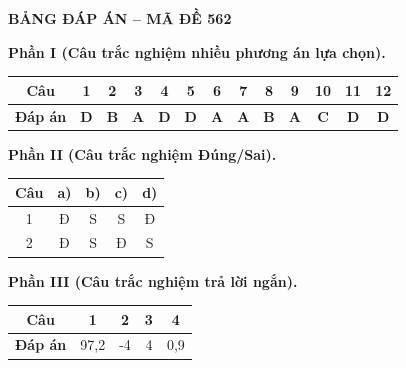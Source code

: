 \vspace{0.4cm}
\noindent\begin{minipage}{\linewidth}
\begin{center}{\large\bfseries\color{red!80!black} BẢNG ĐÁP ÁN -- MÃ ĐỀ 562}\end{center}
\vspace{0.15cm}
\noindent\textbf{Phần I (Câu trắc nghiệm nhiều phương án lựa chọn).}\par\smallskip
\begin{center}
\begin{tabular}{|c|c|c|c|c|c|c|c|c|c|c|c|c|}\hline
\textbf{Câu} & 1 & 2 & 3 & 4 & 5 & 6 & 7 & 8 & 9 & 10 & 11 & 12 \\ \hline
\textbf{Đáp án} & \textbf{D} & \textbf{B} & \textbf{A} & \textbf{D} & \textbf{D} & \textbf{A} & \textbf{A} & \textbf{B} & \textbf{A} & \textbf{C} & \textbf{D} & \textbf{D} \\ \hline
\end{tabular}
\end{center}
\noindent\textbf{Phần II (Câu trắc nghiệm Đúng/Sai).}\par\smallskip
\begin{center}
\begin{tabular}{|c|c|c|c|c|}\hline
\textbf{Câu} & \textbf{a)} & \textbf{b)} & \textbf{c)} & \textbf{d)} \\ \hline
1 & Đ & S & S & Đ \\ \hline
2 & Đ & S & Đ & S \\ \hline
\end{tabular}
\end{center}
\noindent\textbf{Phần III (Câu trắc nghiệm trả lời ngắn).}\par\smallskip
\begin{center}
\begin{tabular}{|c|c|c|c|c|}\hline
\textbf{Câu} & 1 & 2 & 3 & 4 \\ \hline
\textbf{Đáp án} & 97,2 & -4 & 4 & 0,9 \\ \hline
\end{tabular}
\end{center}
\end{minipage}
